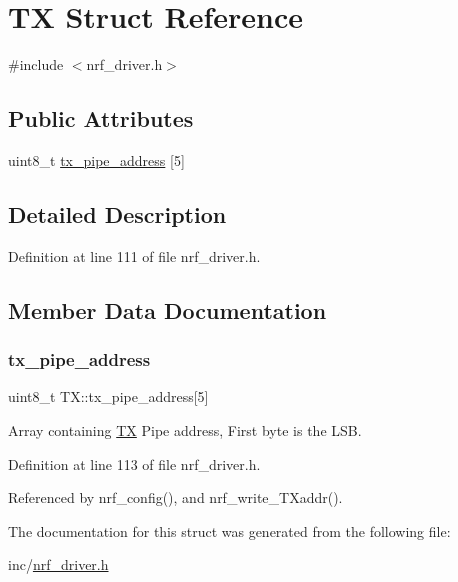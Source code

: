 \hypertarget{struct_t_x}{}\section{TX Struct Reference}
\label{struct_t_x}


{\ttfamily \#include $<$nrf\+\_\+driver.\+h$>$}

\subsection*{Public Attributes}
\begin{DoxyCompactItemize}
\item 
uint8\+\_\+t \hyperlink{struct_t_x_a53fe562ca0ad738c27ac2cbc19c77513}{tx\+\_\+pipe\+\_\+address} \mbox{[}5\mbox{]}
\end{DoxyCompactItemize}


\subsection{Detailed Description}


Definition at line 111 of file nrf\+\_\+driver.\+h.



\subsection{Member Data Documentation}
\mbox{\label{struct_t_x_a53fe562ca0ad738c27ac2cbc19c77513}} 
\subsubsection{\texorpdfstring{tx\+\_\+pipe\+\_\+address}{tx\_pipe\_address}}
{\footnotesize\ttfamily uint8\+\_\+t T\+X\+::tx\+\_\+pipe\+\_\+address\mbox{[}5\mbox{]}}

Array containing \hyperlink{struct_t_x}{TX} Pipe address, First byte is the L\+SB. 

Definition at line 113 of file nrf\+\_\+driver.\+h.



Referenced by nrf\+\_\+config(), and nrf\+\_\+write\+\_\+\+T\+Xaddr().



The documentation for this struct was generated from the following file\+:\begin{DoxyCompactItemize}
\item 
inc/\hyperlink{nrf__driver_8h}{nrf\+\_\+driver.\+h}\end{DoxyCompactItemize}
